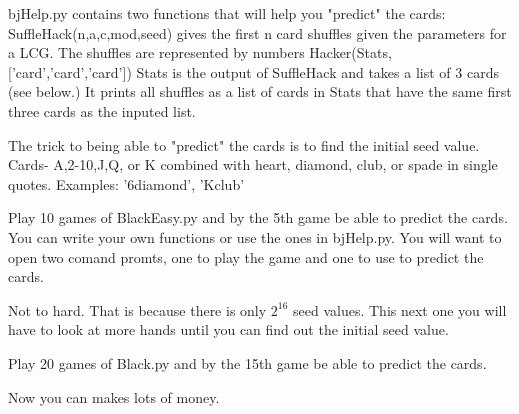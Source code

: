 bjHelp.py contains two functions that will help you "predict" the cards:
SuffleHack(n,a,c,mod,seed) gives the first n card shuffles given the parameters for a LCG. The shuffles are represented by numbers 
Hacker(Stats,['card','card','card']) Stats is the output of SuffleHack and takes a list of 3 cards (see below.) It prints all shuffles as a list of cards in Stats that have the same first three cards as the inputed list.

The trick to being able to "predict" the cards is to find the initial seed value.
Cards- A,2-10,J,Q, or K combined with heart, diamond, club, or spade in single quotes. Examples: '6diamond', 'Kclub'



\begin{problem}
Play 10 games of BlackEasy.py and by the 5th game be able to predict the cards. You can write your own functions or use the ones in bjHelp.py. You will want to open two comand promts, one to play the game and one to use to predict the cards. 
\end{problem}

Not to hard. That is because there is only $2^{16}$ seed values. This next one you will have to look at more hands until you can find out the initial seed value.

\begin{problem}
Play 20 games of Black.py and by the 15th game be able to predict the cards.
\end{problem}

Now you can makes lots of money.

